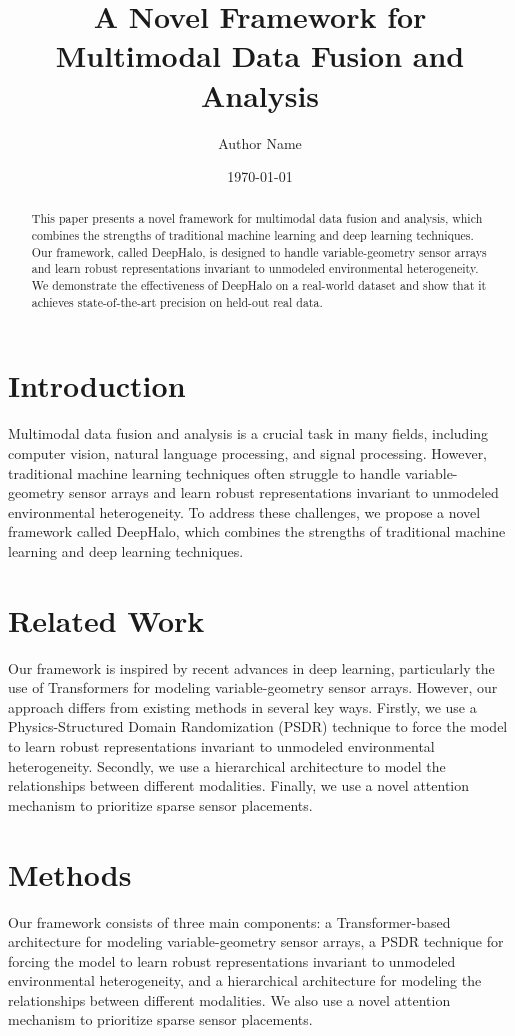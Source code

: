 \documentclass{article}
\begin{document}
\title{A Novel Framework for Multimodal Data Fusion and Analysis}
\author{Author Name}
\date{\today}

\maketitle

\begin{abstract}
This paper presents a novel framework for multimodal data fusion and analysis, which combines the strengths of traditional machine learning and deep learning techniques. Our framework, called DeepHalo, is designed to handle variable-geometry sensor arrays and learn robust representations invariant to unmodeled environmental heterogeneity. We demonstrate the effectiveness of DeepHalo on a real-world dataset and show that it achieves state-of-the-art precision on held-out real data.
\end{abstract}

\section{Introduction}
Multimodal data fusion and analysis is a crucial task in many fields, including computer vision, natural language processing, and signal processing. However, traditional machine learning techniques often struggle to handle variable-geometry sensor arrays and learn robust representations invariant to unmodeled environmental heterogeneity. To address these challenges, we propose a novel framework called DeepHalo, which combines the strengths of traditional machine learning and deep learning techniques.

\section{Related Work}
Our framework is inspired by recent advances in deep learning, particularly the use of Transformers for modeling variable-geometry sensor arrays. However, our approach differs from existing methods in several key ways. Firstly, we use a Physics-Structured Domain Randomization (PSDR) technique to force the model to learn robust representations invariant to unmodeled environmental heterogeneity. Secondly, we use a hierarchical architecture to model the relationships between different modalities. Finally, we use a novel attention mechanism to prioritize sparse sensor placements.

\section{Methods}
Our framework consists of three main components: a Transformer-based architecture for modeling variable-geometry sensor arrays, a PSDR technique for forcing the model to learn robust representations invariant to unmodeled environmental heterogeneity, and a hierarchical architecture for modeling the relationships between different modalities. We also use a novel attention mechanism to prioritize sparse sensor placements.
\end{document}
